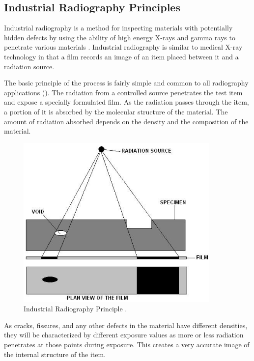 
\subsection{Industrial Radiography Principles}
Industrial radiography is a method for inspecting materials with potentially hidden defects by using the ability of high energy X-rays and gamma rays to penetrate various materials \citep{Reference9}. Industrial radiography is similar to medical X-ray technology in that a film records an image of an item placed between it and a radiation source. 


The basic principle of the process is fairly simple and common to all radiography applications (). The radiation from a controlled source penetrates the test item and expose a specially formulated film. As the radiation passes through the item, a portion of it is absorbed by the molecular structure of the material. The amount of radiation absorbed depends on the density and the composition of the material.

\begin{figure}[htbp]
	\centering
		\includegraphics[width=10cm]{Figures/1.png}
	\caption[Industrial Radiography Principle]{Industrial Radiography Principle \citep{irprinciple}.}%
	\label{fig:1}
\end{figure}

As cracks, fissures, and any other defects in the material have different densities, they will be characterized by different exposure values as more or less radiation penetrates at those points during exposure. This creates a very accurate image of the internal structure of the item. 

